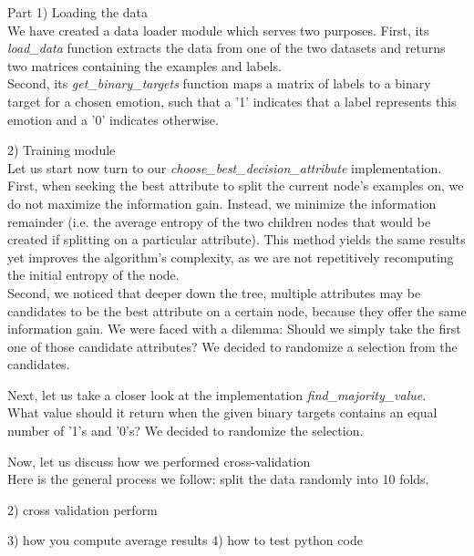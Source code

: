 
Part 1) Loading the data\\
We have created a data loader module which serves two purposes.
First, its \emph{load\_data} function extracts the data from one of the two datasets
and returns two matrices containing the examples and labels. \\
Second, its \emph{get\_binary\_targets} function maps a matrix of labels to a binary target for a chosen emotion,
such that a '1' indicates that a label represents this emotion and a '0' indicates otherwise.

2) Training module \\
Let us start now turn to our \emph{choose\_best\_decision\_attribute} implementation. \\
First, when seeking the best attribute to split the current node's examples on, we do not maximize the information gain.
Instead, we minimize the information remainder (i.e. the average entropy of the two children nodes
that would be created if splitting on a particular attribute).
This method yields the same results yet
improves the algorithm's complexity, as we are not repetitively recomputing the initial entropy of the node.\\
Second, we noticed that deeper down the tree, multiple attributes may be candidates to be the best attribute on a certain node,
because they offer the same information gain. We were faced with a dilemma: Should we simply
take the first one of those candidate attributes? We decided to randomize a selection from the candidates.

Next, let us take a closer look at the implementation \emph{find\_majority\_value}.\\
What value should it return when the given binary targets contains an equal number of
'1's and '0's? We decided to randomize the selection.

Now, let us discuss how we performed cross-validation\\
Here is the general process we follow:
split the data randomly into 10 folds.




2) cross validation perform



3) how you compute average results
4) how to test python code

